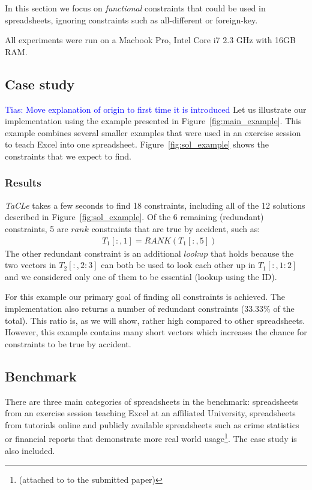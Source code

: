 \documentclass{IEEEtran}
\newcommand{\tias}[1]{\textcolor{blue}{{\sc Tias:} #1}\xspace}
\newcommand{\format}[1]{\textit{#1}\xspace}
\newcommand{\sname}{\format{TaCLe}}
\newcommand{\range}[3]{\ensuremath{#1[#2,#3]}}
\newcommand{\rangeto}[2]{#1{:}#2}
\newcommand{\rangeall}{:}
\newcommand{\eccalc}[2]{\ensuremath{#1 = #2}}
\newcommand{\ecrank}[2]{\eccalc{#1}{\textit{RANK}(#2)}}
\theoremstyle{definition}
\begin{document}
In this section we focus on \textit{functional} constraints that could be used in spreadsheets, ignoring constraints such as all-different or foreign-key.

All experiments were run on a Macbook Pro, Intel Core i7 2.3 GHz with 16GB RAM.

\subsection{Case study}
\tias{Move explanation of origin to first time it is introduced}
Let us illustrate our implementation using the example presented in Figure~\ref{fig:main_example}.
This example combines several smaller examples that were used in an exercise session to teach Excel into one spreadsheet.
Figure~\ref{fig:sol_example} shows the constraints that we expect to find.

\subsubsection{Results}
\sname takes a few seconds to find 18 constraints, including all of the 12 solutions described in Figure~\ref{fig:sol_example}.
Of the 6 remaining (redundant) constraints, 5 are $\mathit{rank}$ constraints that are true by accident, such as: \begin{align*}
  & \ecrank{\range{T_1}{\rangeall}{1}}{\range{T_1}{\rangeall}{5}}
\end{align*}
The other redundant constraint is an additional $\mathit{lookup}$ that holds because the two vectors in \range{T_2}{\rangeall}{\rangeto{2}{3}} can both be used to look each other up in \range{T_1}{\rangeall}{\rangeto{1}{2}} and we considered only one of them to be essential (lookup using the ID).

For this example our primary goal of finding all constraints is achieved.
The implementation also returns a number of redundant constraints ($33.33\%$ of the total).
This ratio is, as we will show, rather high compared to other spreadsheets.
However, this example contains many short vectors which increases the chance for constraints to be true by accident.

\subsection{Benchmark}
There are three main categories of spreadsheets in the benchmark: spreadsheets from an exercise session teaching Excel at an affiliated University, spreadsheets from tutorials online and publicly available spreadsheets such as crime statistics or financial reports that demonstrate more real world usage\footnote{(attached to to the submitted paper)}.
The case study is also included.
\end{document}
